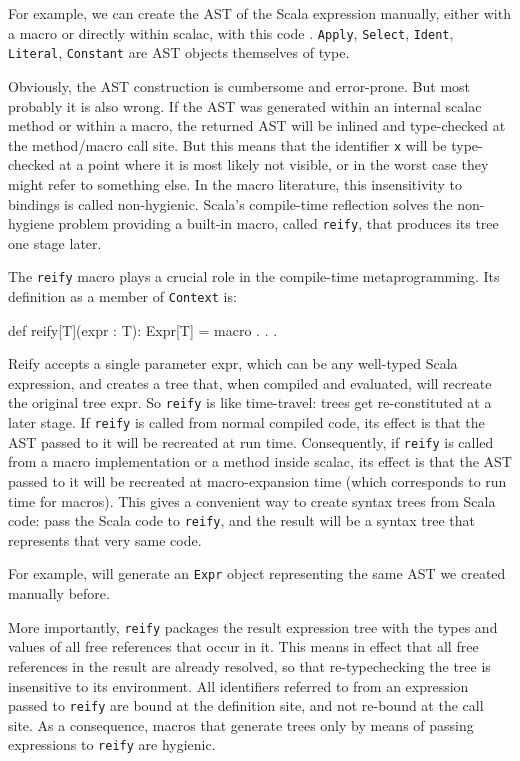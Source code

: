 For example, we can create the AST of the Scala expression  manually,
either with a macro or directly within scalac, with this code
. \texttt{Apply}, \texttt{Select}, \texttt{Ident}, \texttt{Literal},
\texttt{Constant} are AST objects themselves of  type.

Obviously, the AST construction is cumbersome and error-prone. But most probably
it is also wrong. If the AST was generated within an internal scalac method or
within a macro, the returned AST will be inlined and type-checked at the
method/macro call site. But this means that the identifier \texttt{x} will be
type-checked at a point where it is most likely not visible, or in the worst
case they might refer to something else. In the macro literature, this
insensitivity to bindings is called non-hygienic\cite{kohlbecker1986hygienic,nemerle:macros}. Scala's
compile-time reflection solves the non-hygiene problem providing a built-in
macro, called \texttt{reify}, that produces its tree one stage later.

The \texttt{reify} macro plays a crucial role in the compile-time metaprogramming. Its
definition as a member of \texttt{Context} is:

\begin{scalaCode}
def reify[T](expr : T): Expr[T] = macro . . .
\end{scalaCode}

Reify accepts a single parameter expr, which can be any well-typed Scala
expression, and creates a tree that, when compiled and evaluated, will recreate
the original tree expr. So \texttt{reify} is like time-travel: trees get re-constituted
at a later stage. If \texttt{reify} is called from normal compiled code, its effect is
that the AST passed to it will be recreated at run time.
Consequently, if \texttt{reify} is called from a macro implementation or a method inside
scalac, its effect is that the AST passed to it will be recreated at
macro-expansion time (which corresponds to run time for macros). This gives a
convenient way to create syntax trees from Scala code: pass the Scala code to
\texttt{reify}, and the result will be a syntax tree that represents that very same code.

For example,  will generate an \texttt{Expr} object representing the
same AST we created manually before.

More importantly, \texttt{reify} packages the result expression tree with the types and
values of all free references that occur in it. This means in effect that all
free references in the result are already resolved, so that re-typechecking the
tree is insensitive to its environment. All identifiers referred to from
an expression passed to \texttt{reify} are bound at the definition site, and not re-bound
at the call site. As a consequence, macros that generate trees only by means
of passing expressions to \texttt{reify} are hygienic.

